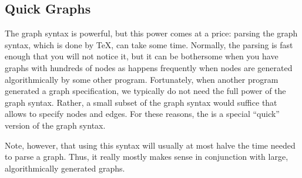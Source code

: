 \subsection{Quick Graphs}

\label{section-library-graphs-quick}

The graph syntax is powerful, but this power comes at a price: parsing
the graph syntax, which is done by \TeX, can take some time. Normally,
the parsing is fast enough that you will not notice it, but it can be
bothersome when you have graphs with hundreds of nodes as happens
frequently when nodes are generated algorithmically by some other
program. Fortunately, when another program generated a graph
specification, we typically do not need the full power of the graph
syntax. Rather, a small subset of the graph syntax would suffice that
allows to specify nodes and edges. For these reasons, the is a special
``quick'' version of the graph syntax.

Note, however, that using this syntax will usually at most halve the
time needed to parse a graph. Thus, it really mostly makes sense in
conjunction with large, algorithmically generated graphs.

